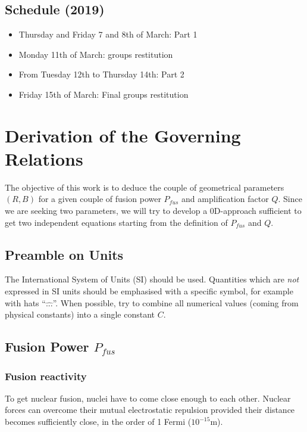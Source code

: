 \subsection{Schedule (2019)}
\begin{itemize}
\item Thursday and Friday 7 and 8th of March: Part 1
\item Monday 11th of March: groups restitution
\item From Tuesday 12th to Thursday 14th: Part 2
\item Friday 15th of March: Final groups restitution
\end{itemize}

\section{Derivation of the Governing Relations}
The objective of this work is to deduce the couple of geometrical parameters $(R,B)$ for a given couple of fusion power $P_{fus}$ and amplification factor $Q$. Since we are seeking two parameters, we will try to develop a 0D-approach sufficient to get two independent equations starting from the definition of $P_{fus}$ and $Q$. 

\subsection{Preamble on Units}
The International System of Units (SI) should be used. Quantities which are \emph{not} expressed in SI units should be emphasised with a specific symbol, for example with hats ``$\hat{...}$''. When possible, try to combine all numerical values (coming from physical constants) into a single constant $C$.

\subsection{Fusion Power $P_{fus}$}
\subsubsection{Fusion reactivity}
To get nuclear fusion, nuclei have to come close enough to each other. Nuclear forces can overcome their mutual electrostatic repulsion provided their distance becomes sufficiently close, in the order of 1 Fermi ($10^{-15}$m). %

